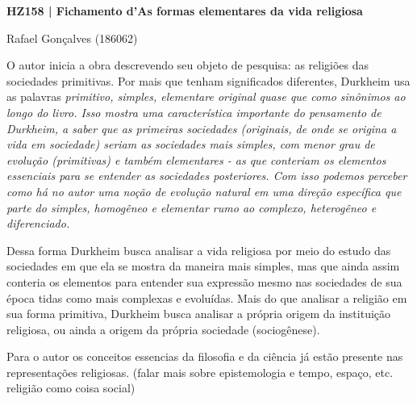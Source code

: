 \documentclass[12pt,a4paper]{article}
\begin{document}
\noindent
\centerline{\large\textbf{HZ158 | Fichamento d'As formas elementares da vida religiosa}}
\centerline{\large Rafael Gonçalves (186062)}
\break
\noindent
O autor inicia a obra descrevendo seu objeto de pesquisa: as religiões das sociedades primitivas. Por mais que tenham significados diferentes, Durkheim usa as palavras \em primitivo\em , \em simples\em , \em elementar\em e \em original \em quase que como sinônimos ao longo do livro. Isso mostra uma característica importante do pensamento de Durkheim, a saber que as primeiras sociedades (originais, de onde se origina a vida em sociedade) seriam as sociedades mais simples, com menor grau de evolução (primitivas) e também elementares - as que conteriam os elementos essenciais para se entender as sociedades posteriores. Com isso podemos perceber como há no autor uma noção de evolução \em natural \em em uma direção específica que parte do simples, homogêneo e elementar rumo ao complexo, heterogêneo e diferenciado.

Dessa forma Durkheim busca analisar a vida religiosa por meio do estudo das sociedades em que ela se mostra da maneira mais simples, mas que ainda assim conteria os elementos para entender sua expressão mesmo nas sociedades de sua época tidas como mais complexas e evoluídas. Mais do que analisar a religião em sua forma primitiva, Durkheim busca analisar a própria origem da instituição religiosa, ou ainda a origem da própria sociedade (sociogênese).

Para o autor os conceitos essencias da filosofia e da ciência já estão presente nas representações religiosas. (falar mais sobre epistemologia e tempo, espaço, etc. religião como coisa social)
\end{document}
